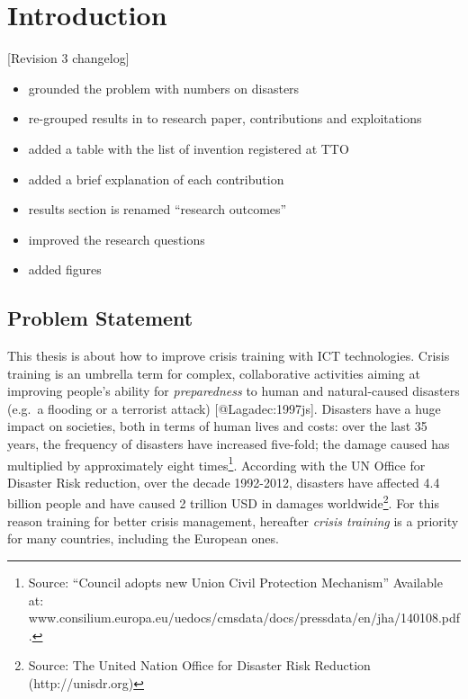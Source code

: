 \mainmatter

\section{Introduction}\label{introduction}

{[}Revision 3 changelog{]}

\begin{itemize}
\itemsep1pt\parskip0pt
\item
  grounded the problem with numbers on disasters
\item
  re-grouped results in to research paper, contributions and
  exploitations
\item
  added a table with the list of invention registered at TTO
\item
  added a brief explanation of each contribution
\item
  results section is renamed ``research outcomes''
\item
  improved the research questions
\item
  added figures
\end{itemize}

\subsection{Problem Statement}\label{problem-statement}

\reversemarginpar

This thesis is about how to improve crisis training with ICT
technologies. Crisis training is an umbrella term for complex,
collaborative activities aiming at improving people's ability for
\emph{preparedness} to human and natural-caused disasters (e.g.~a
flooding or a terrorist attack) {[}@Lagadec:1997js{]}. Disasters have a
huge impact on societies, both in terms of human lives and costs: over
the last 35 years, the frequency of disasters have increased five-fold;
the damage caused has multiplied by approximately eight times\footnote{Source:
  ``Council adopts new Union Civil Protection Mechanism'' Available at:
  www.consilium.europa.eu/uedocs/cmsdata/docs/pressdata/en/jha/140108.pdf.}.
According with the UN Office for Disaster Risk reduction, over the
decade 1992-2012, disasters have affected 4.4 billion people and have
caused 2 trillion USD in damages worldwide\footnote{Source: The United
  Nation Office for Disaster Risk Reduction (http://unisdr.org)}. For
this reason training for better crisis management, hereafter
\emph{crisis training} is a priority for many countries, including the
European ones.

